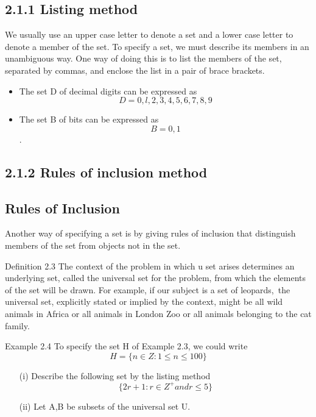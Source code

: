 \documentclass[12pt]{article}
\begin{document}
\smallskip 
\subsection{2.1.1 Listing method}
\smallskip 
We usually use an upper case letter to denote a set and a lower case letter to denote a member of
the set. To specify a set, we must describe its members in an unambiguous way. One way of doing
this is to list the members of the set, separated by commas, and enclose the list in a pair of brace
brackets.
\smallskip 
\smallskip 
\begin{itemize}
\item The set D of decimal digits can be expressed as
\[D = {0, l,2,3,4,5,6,7,8,9}\]
\item The set B of bits can be expressed as
\[B= {0,1}\]. 
\end{itemize}
\smallskip 

\subsection{2.1.2 Rules of inclusion method}
\smallskip 
\subsection{Rules of Inclusion}
Another way of specifying a set is by giving rules of inclusion that distinguish members of the
set from objects not in the set.

Definition 2.3 The context of the problem in which u set arises determines an underlying set,
called the universal set for the problem, from which the elements of the set will be drawn.
\smallskip 
\smallskip 
For example, if our subject is a set of leopards,~the universal set, explicitly stated or implied by the
context, might be all wild animals in Africa or all animals in London Zoo or all animals belonging
to the cat family.

Example 2.4 To specify the set H of Example 2.3, we could write
\[H=\{n \in Z : 1 \leq n \leq 100\} \]

\smallskip 




\begin{itemize}
	\item[(i)] Describe the following set by the listing method
	\[ \{ 2r+1 : r \in Z^{+} and r \leq 5  \} \]
	\item[(ii)] Let A,B be subsets of the universal set U.
	
	
\end{itemize}
\end{document}
